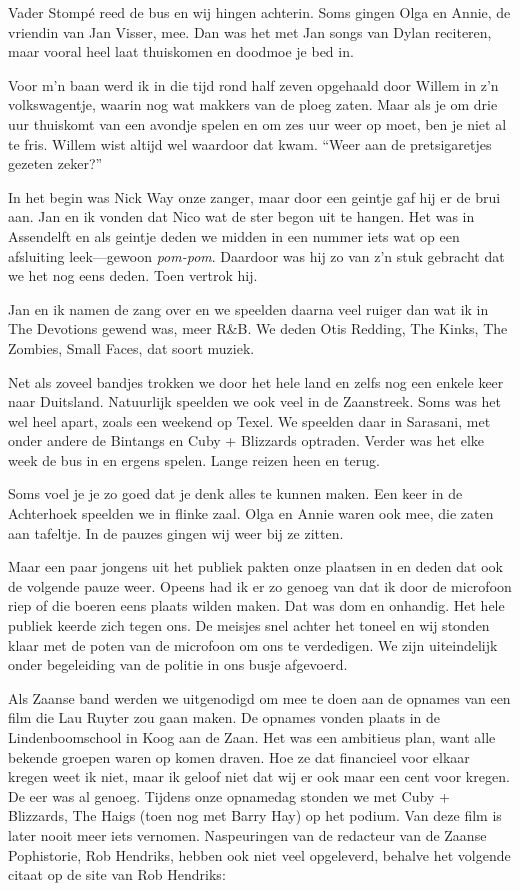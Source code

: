 \documentclass[10pt,twoside,openright]{memoir}
\begin{document}
Vader Stompé reed de bus en wij hingen achterin. Soms gingen Olga en Annie, de vriendin van Jan Visser, mee. Dan was het met Jan songs van Dylan reciteren, maar vooral heel laat thuiskomen en doodmoe je bed in.

Voor m'n baan werd ik in die tijd rond half zeven opgehaald door Willem in z’n volkswagentje, waarin nog wat makkers van de ploeg zaten. Maar als je om drie uur thuiskomt van een avondje spelen en om zes uur weer op moet, ben je niet al te fris. Willem wist altijd wel waardoor dat kwam. ``Weer aan de pretsigaretjes gezeten zeker?''

In het begin was Nick Way onze zanger, maar door een geintje gaf hij er de brui aan. Jan en ik  vonden dat Nico wat de ster begon uit te hangen. Het was in Assendelft en als geintje deden we midden in een nummer iets wat op een afsluiting leek---gewoon \emph{pom-pom}. Daardoor was hij zo van z’n stuk gebracht dat we het nog eens deden. Toen vertrok hij.

Jan en ik namen de zang over en we speelden daarna veel ruiger dan wat ik in The Devotions gewend was, meer R&B. We deden Otis Redding, The Kinks, The Zombies, Small Faces, dat soort muziek.

Net als zoveel bandjes trokken we door het hele land en zelfs nog een enkele keer naar Duitsland. Natuurlijk speelden we ook veel in de Zaanstreek. Soms was het wel heel apart, zoals een weekend op Texel. We speelden daar in Sarasani, met onder andere de Bintangs en Cuby + Blizzards optraden. Verder was het elke week de bus in en ergens spelen. Lange reizen heen en terug.

Soms voel je je zo goed dat je denk alles te kunnen maken. 
Een keer in de Achterhoek speelden we in flinke zaal. Olga en Annie waren ook mee, die zaten aan tafeltje. In de pauzes gingen wij weer bij ze zitten. 

Maar een paar jongens uit het publiek pakten onze plaatsen in en deden dat ook de volgende pauze weer. Opeens had ik er zo genoeg van dat ik door de microfoon riep of die boeren eens plaats wilden maken. Dat was dom en onhandig. Het hele publiek keerde zich tegen ons. De meisjes snel achter het toneel en wij stonden klaar met de poten van de microfoon om ons te verdedigen. We zijn uiteindelijk onder begeleiding van de politie in ons busje afgevoerd.

Als Zaanse band werden we uitgenodigd om mee te doen aan de opnames van een film die Lau Ruyter zou gaan maken. De opnames vonden plaats in de Lindenboomschool in Koog aan de Zaan. Het was een ambitieus plan, want alle bekende groepen waren op komen draven. Hoe ze dat financieel voor elkaar kregen weet ik niet, maar ik geloof niet dat wij er ook maar een cent voor kregen. De eer was al genoeg. Tijdens onze opnamedag stonden we met Cuby + Blizzards, The Haigs (toen nog met Barry Hay) op het podium. Van deze film is later nooit meer iets vernomen. Naspeuringen van de redacteur van de Zaanse Pophistorie, Rob Hendriks, hebben ook niet veel opgeleverd, behalve het volgende citaat op de site van Rob Hendriks: 
\end{document}
